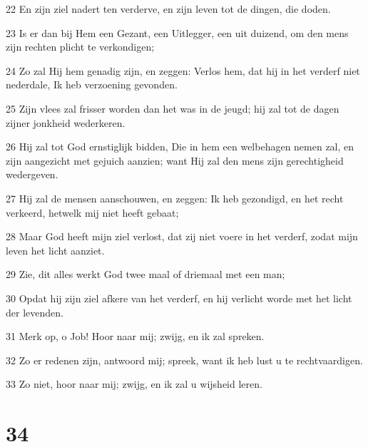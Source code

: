 \par 22 En zijn ziel nadert ten verderve, en zijn leven tot de dingen, die doden.
\par 23 Is er dan bij Hem een Gezant, een Uitlegger, een uit duizend, om den mens zijn rechten plicht te verkondigen;
\par 24 Zo zal Hij hem genadig zijn, en zeggen: Verlos hem, dat hij in het verderf niet nederdale, Ik heb verzoening gevonden.
\par 25 Zijn vlees zal frisser worden dan het was in de jeugd; hij zal tot de dagen zijner jonkheid wederkeren.
\par 26 Hij zal tot God ernstiglijk bidden, Die in hem een welbehagen nemen zal, en zijn aangezicht met gejuich aanzien; want Hij zal den mens zijn gerechtigheid wedergeven.
\par 27 Hij zal de mensen aanschouwen, en zeggen: Ik heb gezondigd, en het recht verkeerd, hetwelk mij niet heeft gebaat;
\par 28 Maar God heeft mijn ziel verlost, dat zij niet voere in het verderf, zodat mijn leven het licht aanziet.
\par 29 Zie, dit alles werkt God twee maal of driemaal met een man;
\par 30 Opdat hij zijn ziel afkere van het verderf, en hij verlicht worde met het licht der levenden.
\par 31 Merk op, o Job! Hoor naar mij; zwijg, en ik zal spreken.
\par 32 Zo er redenen zijn, antwoord mij; spreek, want ik heb lust u te rechtvaardigen.
\par 33 Zo niet, hoor naar mij; zwijg, en ik zal u wijsheid leren.

\chapter{34}

